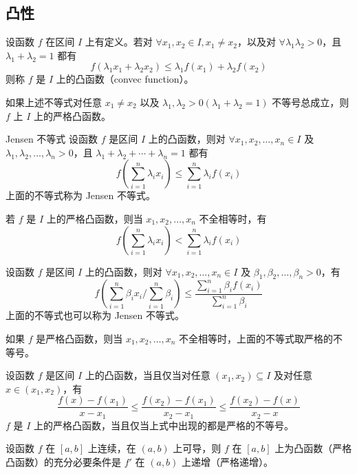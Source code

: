 \subsection{凸性}

\begin{definition}
  设函数 $f$ 在区间 $I$ 上有定义。若对 $\forall x_1,x_2 \in I, x_1 \ne x_2$，以及对 $\forall \lambda_1 \lambda_2 > 0$，且 $\lambda_1 + \lambda_2 = 1$ 都有
  \[f(\lambda_{1}x_1 + \lambda_{2}x_2) \leqslant \lambda_{1}f(x_1) + \lambda_{2}f(x_2)\]
  则称 $f$ 是 $I$ 上的凸函数（convec function）。

  如果上述不等式对任意 $x_1 \ne x_2$ 以及 $\lambda_1,\lambda_2 > 0(\lambda_1 + \lambda_2 = 1)$ 不等号总成立，则 $f$ 上 $I$ 上的严格凸函数。
\end{definition}

\begin{theorem}{Jensen 不等式}
  设函数 $f$ 是区间 $I$ 上的凸函数，则对 $\forall x_1,x_2, \ldots ,x_n \in I$ 及 $\lambda_1,\lambda_2, \ldots ,\lambda_n > 0$，且 $\lambda_1 + \lambda_2 + \cdots + \lambda_n = 1$ 都有
  \[f(\sum_{i = 1}^{n}\lambda_{i}x_i) \leqslant \sum_{i = 1}^{n}\lambda_{i}f(x_i)\]
  上面的不等式称为 Jensen 不等式。

  若 $f$ 是 $I$ 上的严格凸函数，则当 $x_1,x_2, \ldots ,x_n$ 不全相等时，有
  \[f(\sum_{i = 1}^{n}\lambda_{i}x_i) < \sum_{i = 1}^{n}\lambda_{i}f(x_i)\]
\end{theorem}

\begin{theorem}
  设函数 $f$ 是区间 $I$ 上的凸函数，则对 $\forall x_1,x_2, \ldots ,x_n \in I$ 及 $\beta_1,\beta_2, \ldots ,\beta_n >0$，有
  \[f(\sum_{i = 1}^{n}\beta_{i}x_{i}/\sum_{i = 1}^{n}\beta_i) \leqslant \frac{\displaystyle \sum_{i = 1}^{n}\beta_{i}f(x_i)}{\displaystyle \sum_{i = 1}^{n}\beta_i}\]
  上面的不等式也可以称为 Jensen 不等式。

  如果 $f$ 是严格凸函数，则当 $x_1,x_2, \ldots ,x_n$ 不全相等时，上面的不等式取严格的不等号。
\end{theorem}

\begin{theorem}
  设函数 $f$ 是区间 $I$ 上的凸函数，当且仅当对任意 $(x_1,x_2) \subseteq I$ 及对任意 $x \in (x_1,x_2)$，有
  \[\frac{f(x) - f(x_1)}{x - x_1} \leqslant \frac{f(x_2) - f(x_1)}{x_2 - x_1} \leqslant \frac{f(x_2) - f(x)}{x_2 - x}\]
  $f$ 是 $I$ 上的严格凸函数，当且仅当上式中出现的都是严格的不等号。
\end{theorem}

\begin{theorem}
  设函数 $f$ 在 $[a,b]$ 上连续，在 $(a,b)$ 上可导，则 $f$ 在 $[a,b]$ 上为凸函数（严格凸函数）的充分必要条件是 $f'$ 在 $(a,b)$ 上递增（严格递增）。
\end{theorem}

